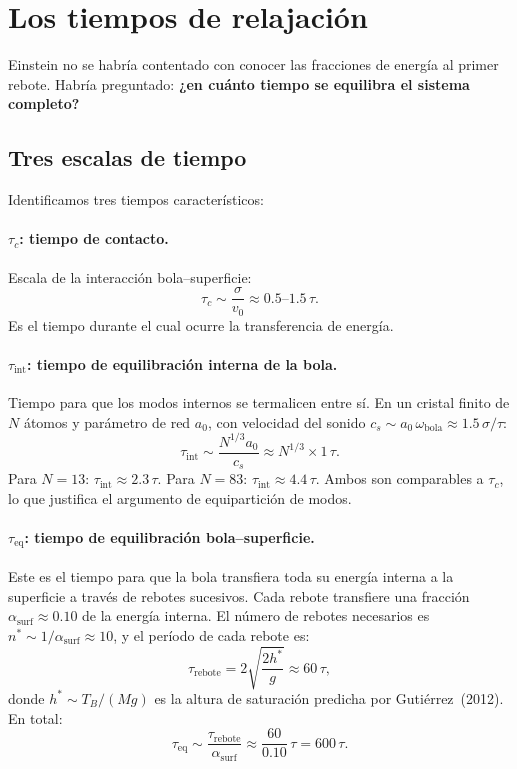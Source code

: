 \documentclass[11pt, a4paper]{article}
\begin{document}
\section{Los tiempos de relajación}

Einstein no se habría contentado con conocer las fracciones de energía al
primer rebote. Habría preguntado: \textbf{¿en cuánto tiempo se equilibra el
sistema completo?}

\subsection{Tres escalas de tiempo}

Identificamos tres tiempos característicos:

\paragraph{$\tau_c$: tiempo de contacto.}
Escala de la interacción bola--superficie:
\begin{equation}
  \tau_c \sim \frac{\sigma}{v_0} \approx 0.5\text{--}1.5\,\tau.
\end{equation}
Es el tiempo durante el cual ocurre la transferencia de energía.

\paragraph{$\tau_\text{int}$: tiempo de equilibración interna de la bola.}
Tiempo para que los modos internos se termalicen entre sí. En un cristal
finito de $N$ átomos y parámetro de red $a_0$, con velocidad del sonido
$c_s \sim a_0\,\omega_\text{bola} \approx 1.5\,\sigma/\tau$:
\begin{equation}
  \tau_\text{int} \sim \frac{N^{1/3} a_0}{c_s} \approx N^{1/3} \times 1\,\tau.
\end{equation}
Para $N=13$: $\tau_\text{int} \approx 2.3\,\tau$. Para $N=83$:
$\tau_\text{int} \approx 4.4\,\tau$. Ambos son comparables a $\tau_c$, lo
que justifica el argumento de equipartición de modos.

\paragraph{$\tau_\text{eq}$: tiempo de equilibración bola--superficie.}
Este es el tiempo para que la bola transfiera toda su energía interna a la
superficie a través de rebotes sucesivos. Cada rebote transfiere una fracción
$\alpha_\text{surf} \approx 0.10$ de la energía interna. El número de rebotes
necesarios es $n^* \sim 1/\alpha_\text{surf} \approx 10$, y el período de
cada rebote es:
\begin{equation}
  \tau_\text{rebote} = 2\sqrt{\frac{2h^*}{g}} \approx 60\,\tau,
\end{equation}
donde $h^* \sim T_B/(Mg)$ es la altura de saturación predicha por
Gutiérrez~(2012). En total:
\begin{equation}
  \tau_\text{eq} \sim \frac{\tau_\text{rebote}}{\alpha_\text{surf}}
  \approx \frac{60}{0.10}\,\tau = 600\,\tau.
\end{equation}
\end{document}
